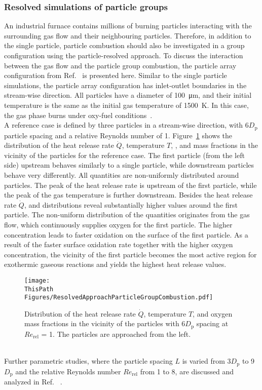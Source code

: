 \begin{btUnit}
\newpage
\subsubsection{Resolved simulations of particle groups}
An industrial furnace contains millions of burning particles interacting with the surrounding gas flow and their neighbouring particles. Therefore, in addition to the single particle, particle combustion should also be investigated in a group configuration using the particle-resolved approach. To discuss the interaction between the gas flow and the particle group combustion, the particle array configuration from Ref.~\cite{Sayadi2017} is presented here. Similar to the single particle simulations, the particle array configuration has inlet-outlet boundaries in the stream-wise direction. All particles have a diameter of \SI{100}{\micro\metre}, and their initial temperature is the same as the initial gas temperature of \SI{1500}{K}. In this case, the gas phase burns under oxy-fuel conditions~\cite{Sayadi2017}.
\\
A reference case is defined by three particles in a stream-wise direction, with 6$D_\mathrm{p}$ particle spacing and a relative Reynolds number of 1. Figure~\ref{fig:B3RFQandTen} shows the distribution of the heat release rate $\dot{Q}$, temperature $T$, , and  mass fractions in the vicinity of the particles for the reference case. The first particle (from the left side) upstream behaves similarly to a single particle, while downstream particles behave very differently. All quantities are non-uniformly distributed around particles. The peak of the heat release rate is upstream of the first particle, while the peak of the gas temperature is further downstream. Besides the heat release rate $\dot{Q}$,  and  distributions reveal substantially higher values around the first particle. The non-uniform distribution of the quantities originates from the gas flow, which continuously supplies oxygen for the first particle. The higher  concentration leads to faster oxidation on the surface of the first particle. As a result of the faster surface oxidation rate together with the higher oxygen concentration, the vicinity of the first particle becomes the most active region for exothermic gaseous reactions and yields the highest heat release values.
\begin{figure}[h]
	\texttt{[image: \\ThisPath Figures/ResolvedApproachParticleGroupCombustion.pdf]}
	\caption{Distribution of the heat release rate $\dot{Q}$, temperature $T$,  and oxygen mass fractions in the vicinity of the particles with 6$D_\mathrm{p}$ spacing at $Re_\mathrm{rel}$ = 1. The particles are approached from the left.}\label{fig:B3RFQandTen}
\end{figure}
\\
Further parametric studies, where the particle spacing $L$ is varied from 3$D_\mathrm{p}$ to 9$D_\mathrm{p}$ and the relative Reynolds number $Re_\mathrm{rel}$ from 1 to 8, are discussed and analyzed in Ref. ~\cite{Sayadi2017}.



\end{btUnit}
